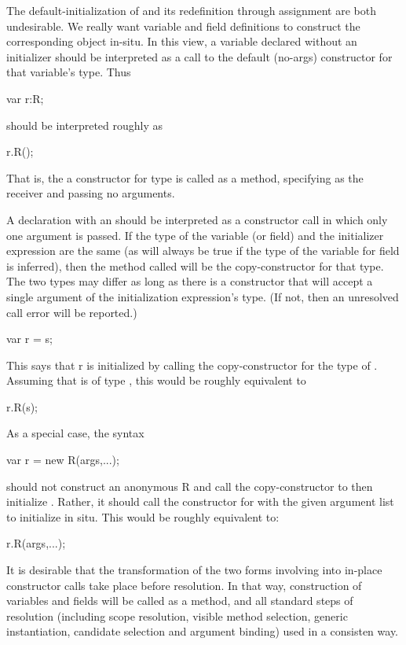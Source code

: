 The default-initialization of  and its
redefinition through assignment are both undesirable.  We really want variable and field
definitions to construct the corresponding object in-situ.  In this view, a variable
declared without an initializer should be interpreted as a call to the default (no-args)
constructor for that variable's type.  Thus
\begin{chapel}
var r:R;
\end{chapel}
\noindent
should be interpreted roughly as
\begin{chapel}
r.R();
\end{chapel}
That is, the a constructor for type  is called as a method, specifying  as
the receiver and passing no arguments.

A declaration with an  should be interpreted as a constructor call
in which only one argument is passed.  If the type of the variable (or field) and the initializer
expression are the same (as will always be true if the type of the variable for field is
inferred), then the method called will be the copy-constructor for that type.  The two
types may differ as long as there is a constructor that will accept a single argument of
the initialization expression's type.  (If not, then an unresolved call error will be
reported.)
\begin{chapel}
var r = s;
\end{chapel}
This says that r is initialized by calling the copy-constructor for the type of .
Assuming that  is of type , this would be roughly equivalent to
\begin{chapel}
r.R(s);
\end{chapel}

As a special case, the syntax
\begin{chapel}
var r = new R(args,...);
\end{chapel}
\noindent
should not construct an anonymous R and call the copy-constructor to then initialize
.  Rather, it should call the constructor for  with the given argument
list to initialize  in situ.  This would be roughly equivalent to:
\begin{chapel}
r.R(args,...);
\end{chapel}

It is desirable that the transformation of the two forms involving \chpl{=} into in-place
constructor calls take place before resolution.  In that way, construction of variables
and fields will be called as a method, and all standard steps of resolution (including
scope resolution, visible method selection, generic instantiation, candidate selection and
argument binding) used in a consisten way.

